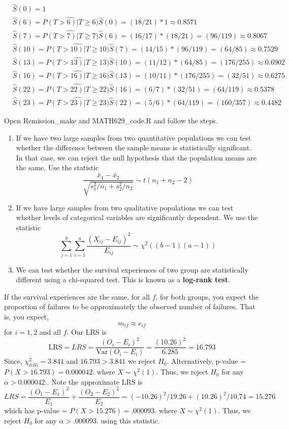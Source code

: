 \documentclass{article}
\begin{document}
\begin{align*}
&\hat{S}(0)=1 \\
&\hat{S}(6)=\hat{P(T>6)|T \ge 6)} \hat{S}(0) = (18/21)*1 \approx 0.8571 \\
&\hat{S}(7)=\hat{P(T>7)|T \ge 7)} \hat{S}(6) = (16/17)*(18/21) = (96/119) \approx 0.8067 \\
&\hat{S}(10)=\hat{P(T>10)|T \ge 10)} \hat{S}(7) = (14/15)*(96/119) = (64/85) \approx 0.7529 \\
&\hat{S}(13)=\hat{P(T>13)|T \ge 13)} \hat{S}(10) = (11/12)*(64/85) = (176/255) \approx 0.6902 \\
&\hat{S}(16)= \hat{P(T>16)|T \ge 16)} \hat{S}(13) = (10/11)*(176/255) = (32/51) \approx 0.6275 \\
&\hat{S}(22)= \hat{P(T>22)|T \ge 22)} \hat{S}(16) = (6/7)*(32/51) = (64/119) \approx 0.5378 \\
&\hat{S}(23)= \hat{P(T>23)|T \ge 23)} \hat{S}(22) = (5/6)*(64/119) = (160/357) \approx 0.4482 \
\end{align*}

Open Remission\_make and MATH629\_code.R and follow the steps.


\begin{enumerate}
\item If we have two large samples from two quantitative populations we can test whether the difference between the sample means is statistically significant. In that case, we can reject the null hypothesis that the population means are the same. Use the statistic
\[
\frac{\bar{x}_1 - \bar{x}_2}{\sqrt{s_1^2/n_1 + s_2^2/n_2}} \sim t(n_1+n_2-2)
\]
\item If we have large samples from two qualitative populations we can test whether levels of categorical variables are significantly dependent. We use the statistic
\[
  \sum_{j=1}^b \sum_{i=1}^a \frac{(X_{ij}-E_{ij})^2}{E_{ij}} \sim \chi^2((b-1)(a-1))
  \]
\item We can test whether the survival experiences of two group are statistically different using a chi-squared test. This is known as a \textbf{log-rank test}.
\end{enumerate}

 If the survival experiences are the same, for all $f$, for both groups, you expect the proportion of failures to be approximately the observed number of failures. That is, you expect,
\[
m_{if} \approx e_{if}
\]
for $i=1,2$ and all $f$.
Our LRS is
\[
\text{LRS} = LRS = \frac{(O_i - E_i)^2}{\text{Var}(O_i-E_i)} = \frac{(10.26)^2}{6.285} = 16.793
\]
Since, $\chi^2_{0.05} = 3.841$ and $16.793>3.841$ we reject $H_0$. Alternatively,
p-value = $P(X > 16.793) =  0.000042.$ where $X \sim \chi^2(1)$. Thus, we reject $H_0$ for any $\alpha>0.000042.$.
Note the approximate LRS is
\[
LRS = \frac{(O_1 - E_1)^2}{E_1} + \frac{(O_2 - E_2)^2}{E_2} = (-10.26)^2/19.26 + (10.26)^2/10.74 = 15.276
\]
which has p-value = $P(X > 15.276) =  .000093.$ where $X \sim \chi^2(1)$. Thus, we reject $H_0$ for any $\alpha>.000093.$ using this statistic.
\end{document}
